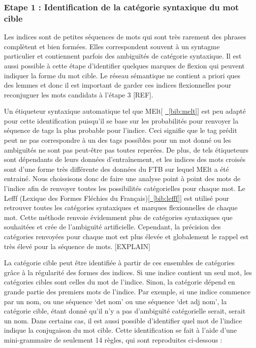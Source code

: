 \subsubsection{Etape 1 : Identification de la catégorie syntaxique du mot cible}
Les indices sont de petites séquences de mots qui sont très rarement des phrases 
complètent et bien formées. Elles correspondent souvent à un syntagme 
particulier et contiennent parfois des ambiguïtés de catégorie syntaxique. Il 
est aussi possible à cette étape d'identifier quelques marques de flexion qui 
peuvent indiquer la forme du mot cible. Le réseau sémantique ne contient a 
priori ques des lemmes et donc il est important de garder ces indices 
flexionnelles pour reconjuguer les mots candidats à l'étape 3 [REF].  

Un étiqueteur syntaxique automatique tel que MElt[ 
\hyperref[bib:melt]{~\ref*{bib:melt}}] est peu adapté pour cette identification 
puisqu'il se base sur les probabilités pour renvoyer la séquence de tags la plus 
probable pour l'indice. Ceci signifie que le tag prédit peut ne pas correspondre 
à un des tags possibles pour un mot donné ou les ambiguïtés ne sont pas 
peut-être pas toutes reperées. De plus, de tels étiqueteurs sont dépendants de 
leurs données d'entraînement, et les indices des mots croisés sont d'une forme 
très différente des données du FTB sur lequel MElt a été entrainé. Nous 
choissisons donc de faire une analyse point à point des mots de l'indice afin de 
renvoyer toutes les possibilités catégorielles pour chaque mot. Le Lefff 
(Lexique des Formes Fléchies du 
Français)[\hyperref[bib:lefff]{~\ref*{bib:lefff}}] est utilisé pour retrouver 
toutes les catégories syntaxiques et marques flexionnelles de chaque mot. Cette 
méthode renvoie évidemment plus de catégories syntaxiques que souhaitées et crée 
de l'ambiguïté artificielle. Cependant, la précision des catégories renvoyées 
pour chaque mot est plus élevée et globalement le rappel est très élevé pour la 
séquence de mots. [EXPLAIN]

La catégorie cible peut être identifiée à partir de ces ensembles de catégories 
grâce à la régularité des formes des indices. Si une indice contient un seul 
mot, les catégories cibles sont celles du mot de l'indice. Sinon, la catégorie 
dépend en grande partie des premiers mots de l'indice. Par exemple, si une 
indice commence par un nom, ou une séquence \lq{det nom}\rq{} ou une séquence 
\lq{det adj nom}\rq{}, la catégorie cible, étant donné qu'il n'y a pas 
d'ambiguïté catégorielle serait, serait un nom. Dans certains cas, il est aussi 
possible d'identifier quel mot de l'indice indique la conjugaison du mot cible. 
Cette identification se fait à l'aide d'une mini-grammaire de seulement 14 
règles, qui sont reproduites ci-dessous :

